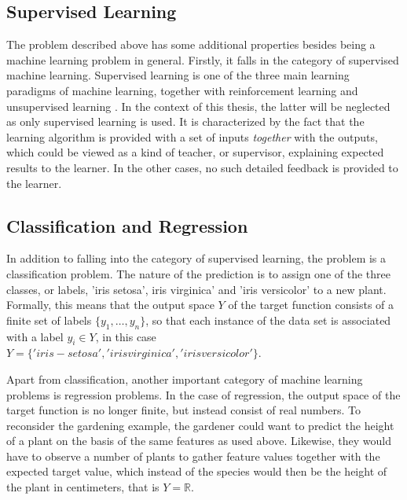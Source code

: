 
\subsection{Supervised Learning}
The problem described above has some additional properties besides being a machine learning problem in general. Firstly, it falls in the category of supervised machine learning. Supervised learning is one of the three main learning paradigms of machine learning, together with reinforcement learning and unsupervised learning \cite{abu2012learning}. In the context of this thesis, the latter will be neglected as only supervised learning is used. It is characterized by the fact that the learning algorithm is provided with a set of inputs \textit{together} with the outputs, which could be viewed as a kind of teacher, or supervisor, explaining expected results to the learner. In the other cases, no such detailed feedback is provided to the learner. 

\subsection{Classification and Regression}
In addition to falling into the category of supervised learning, the problem is a classification problem. The nature of the prediction is to assign one of the three classes, or labels, 'iris setosa', iris virginica' and 'iris versicolor' to a new plant. Formally, this means that the output space $Y$ of the target function consists of a finite set of labels $\lbrace y_1,\dots,y_n\rbrace$, so that each instance of the data set is associated with a label $y_i \in Y$, in this case $Y=\lbrace 'iris-setosa','iris virginica', 'iris versicolor' \rbrace $. 

Apart from classification, another important category of machine learning problems is regression problems. In the case of regression, the output space of the target function is no longer finite, but instead consist of real numbers. To reconsider the gardening example, the gardener could want to predict the height of a plant on the basis of the same features as used above. Likewise, they would have to observe a number of plants to gather feature values together with the expected target value, which instead of the species would then be the height of the plant in centimeters, that is $Y=\mathbb{R}$.


